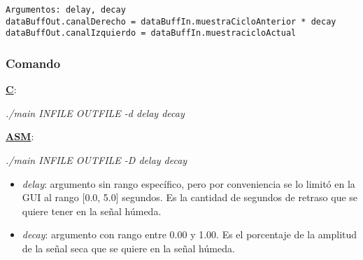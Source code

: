 \lstset{language=C}
\begin{lstlisting}[frame=single]
Argumentos: delay, decay
dataBuffOut.canalDerecho = dataBuffIn.muestraCicloAnterior * decay
dataBuffOut.canalIzquierdo = dataBuffIn.muestracicloActual
\end{lstlisting}

\subsubsection{Comando}
\label{subsec:desarrollo-delay-call}

\underline{\textbf{C}}:
\begin{center}
 \textit{./main INFILE OUTFILE -d delay decay}
\end{center}

\underline{\textbf{ASM}}:
\begin{center}
 \textit{./main INFILE OUTFILE -D delay decay}
\end{center}

\begin{itemize}
 \item \textit{delay}: argumento sin rango específico, pero por conveniencia se lo limitó en la GUI al rango [0.0, 5.0] segundos. Es la cantidad de segundos de retraso que se quiere tener en la señal húmeda.
 \item \textit{decay}: argumento con rango entre 0.00 y 1.00. Es el porcentaje de la amplitud de la señal seca que se quiere en la señal húmeda.
\end{itemize}
